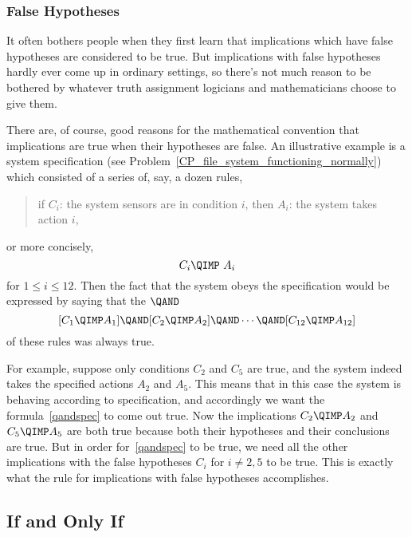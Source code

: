 \subsubsection{False Hypotheses}

It often bothers people when they first learn that implications
which have false hypotheses are considered to be true.  But
implications with false hypotheses hardly ever come up in ordinary
settings, so there's not much reason to be bothered by whatever truth
assignment logicians and mathematicians choose to give them.

There are, of course, good reasons for the mathematical convention
that implications are true when their hypotheses are false.  An
illustrative example is a system specification (see
Problem~\ref{CP_file_system_functioning_normally}) which consisted of
a series of, say, a dozen rules,
\begin{quote}
if $C_i$: the system sensors are in condition $i$, then $A_i$: the
system takes action $i$,
\end{quote}
or more concisely,
\[
C_i \QIMP\ A_i
\]
for $1 \leq i \leq 12$.  Then the fact that the system obeys the
specification would be expressed by saying that the $\QAND$
\begin{equation}\label{qandspec}
[C_1 \QIMP A_1] \QAND [C_2 \QIMP A_2] \QAND \cdots \QAND [C_{12} \QIMP A_{12}]
\end{equation}
of these rules was always true.

For example, suppose only conditions $C_2$ and $C_5$ are true, and the
system indeed takes the specified actions $A_2$ and $A_5$.  This means
that in this case the system is behaving according to specification,
and accordingly we want the formula~\eqref{qandspec} to come out true.
Now the implications $C_2 \QIMP A_2$ and $C_5 \QIMP A_5$ are both
true because both their hypotheses and their conclusions are true.
But in order for~\eqref{qandspec} to be true, we need all the other
implications with the false hypotheses $C_i$ for $i \neq 2, 5$ to be
true.  This is exactly what the rule for implications with false
hypotheses accomplishes.

\subsection{If and Only If}

